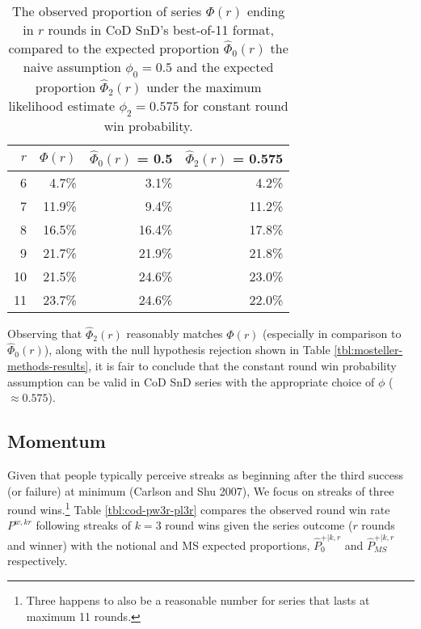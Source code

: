 \documentclass{article}
\begin{document}
\begin{longtable}[]{@{}rrrr@{}}
\caption{The observed proportion of series $\Phi(r)$ ending in $r$ rounds in CoD SnD's best-of-11 format, compared to the expected proportion $\hat{\Phi}_0(r)$ the naive assumption $\phi_0 = 0.5$ and the expected proportion $\hat{\Phi}_2(r)$ under the maximum likelihood estimate $\phi_2 = 0.575$ for constant round win probability.}\label{tbl:expected-series-lengths-alternative-ps} \\
\toprule()
$r$ & $\Phi(r)$ & $\hat{\Phi}_0(r)$ = 0.5 & $\hat{\Phi}_2(r)$ = 0.575 \\
\midrule()
\endhead
6 & 4.7\% & 3.1\% & 4.2\% \\
7 & 11.9\% & 9.4\% & 11.2\% \\
8 & 16.5\% & 16.4\% & 17.8\% \\
9 & 21.7\% & 21.9\% & 21.8\% \\
10 & 21.5\% & 24.6\% & 23.0\% \\
11 & 23.7\% & 24.6\% & 22.0\% \\
\bottomrule()
\end{longtable}

Observing that \(\hat{\Phi}_2(r)\) reasonably matches \(\Phi(r)\)
(especially in comparison to \(\hat{\Phi}_0(r)\)), along with the null
hypothesis rejection shown in Table \ref{tbl:mosteller-methods-results},
it is fair to conclude that the constant round win probability
assumption can be valid in CoD SnD series with the appropriate choice of
\(\phi\) (\(\approx 0.575\)).

\hypertarget{momentum-1}{%
\subsection{Momentum}\label{momentum-1}}

Given that people typically perceive streaks as beginning after the
third success (or failure) at minimum (Carlson and Shu 2007), We focus
on streaks of three round wins.\footnote{Three happens to also be a
  reasonable number for series that lasts at maximum 11 rounds.} Table
\ref{tbl:cod-pw3r-pl3r} compares the observed round win rate
\(P^{w,kr}\) following streaks of \(k=3\) round wins given the series
outcome (\(r\) rounds and winner) with the notional and MS expected
proportions, \(\hat{P}^{+|k,r}_0\) and \(\hat{P}^{+|k,r}_{MS}\)
respectively.
\end{document}
